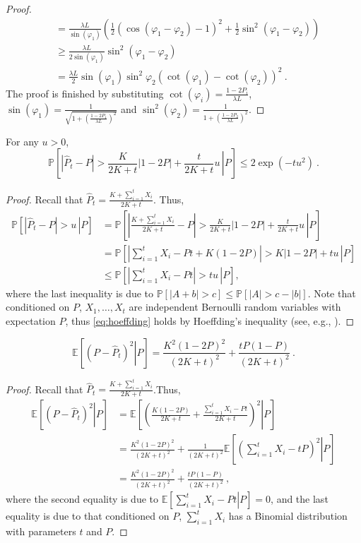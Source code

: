 \documentclass[english]{article}
\newcommand{\hP}{\hat{P}}
\newcommand{\Expc}[2]{\mathbb{E}\left[ \left. #1 \right| #2 \right]}
\newcommand{\Prob}[1]{\mathbb{P}\left[#1\right]}
\newcommand{\Probc}[2]{\mathbb{P}\left[\left. #1 \, \right| #2\right]}
\begin{document}
\begin{proof}
\begin{align}
	& = \frac{\lambda L}{\sin (\varphi_{1})} \left(\frac{1}{2}\left(\cos(\varphi_{1}-\varphi_{2})-1\right)^2 + \frac{1}{2} \sin^2 (\varphi_{1}-\varphi_{2})\right) \\
	& \ge  \frac{\lambda L}{2 \sin (\varphi_{1})}  \sin^2 (\varphi_{1}-\varphi_{2}) \nonumber \\
	& = \frac{\lambda L}{2} \sin (\varphi_{1}) \sin^2 \varphi_{2} \left(\cot (\varphi_{1} )- \cot (\varphi_{2})\right)^2~. %
	\end{align}
	The proof is finished by substituting $\cot (\varphi_i) = \frac{1-2P_i}{\lambda L}$, $\sin(\varphi_1) = \frac{1}{\sqrt{1+\left(\frac{1-2P_1}{\lambda L}\right)^2}}$ and $\sin^2 (\varphi_2) =   \frac{1}{1+\left(\frac{1-2P_2}{\lambda L}\right)^2}$.
\end{proof}

\begin{lemma}[Concentration of $\hP_{t}$] For any $u>0$,
	\label{lem:concenPhat}
	\[
	\Probc{|\hat P_{t}-P| > \frac{K}{2K+t}|1-2P| + \frac{t}{2K+t}u}{P} \le 2\exp(-tu^2)~.
	\]
\end{lemma}
\begin{proof}
	Recall that $\hat P_t = \frac{K+\sum_{i=1}^{t}X_i}{2K+t}$. Thus, 
	\begin{align} 
	\Probc{|\hat P_{t}-P| > u }{P} & = \Probc{\left| \frac{K+\sum_{i=1}^{t}X_i}{2K+t} -P\right| > \frac{K}{2K+t}|1-2P| + \frac{t}{2K+t}u}{P} \nonumber \\ 
	& =  \Probc{\left| \sum_{i=1}^{t}X_i - Pt + K(1-2P) \right| > K|1-2P|+ tu }{P} \nonumber \\ 
	& \le \Probc{\left| \sum_{i=1}^{t}X_i - Pt \right| > tu }{P}, \label{eq:hoeffding}
	\end{align}
	where the last inequality is due to $\Prob{|A+b|>c} \le \Prob{|A| > c-|b|}$. Note that conditioned on $P$, $X_1, \ldots, X_t$ are independent Bernoulli random variables with expectation $P$, thus \eqref{eq:hoeffding} holds by Hoeffding's inequality (see, e.g., \cite[Corollary~A.1]{CBLu06:book}).
\end{proof}

\begin{lemma}
	\label{lem:bayeserror}
	\[
	\Expc{(P-\hat{P}_t)^2}{P} = \frac{K^2(1-2P)^2}{(2K+t)^2} + \frac{tP(1-P)}{(2K+t)^2}~.
	\]
\end{lemma}
\begin{proof}
	Recall that $\hat P_t = \frac{K+\sum_{i=1}^{t}X_i}{2K+t}$.Thus, 
	\begin{align*}
	\Expc{(P-\hat{P}_t)^2}{P} & = \Expc{\left(\frac{K(1-2P)}{2K+t} + \frac{\sum_{i=1}^{t}X_i- Pt}{2K+t}\right)^2}{P} \\
	& = \frac{K^2(1-2P)^2}{(2K+t)^2} + \frac{1}{(2K+t)^2}\Expc{ \left(\sum_{i=1}^{t}X_i - tP\right)^2}{P} \\
	& = \frac{K^2(1-2P)^2}{(2K+t)^2} + \frac{tP(1-P)}{(2K+t)^2}~,
	\end{align*}
	where the second equality is due to $\Expc{ \sum_{i=1}^{t}X_i - Pt}{P} =0$, and the last equality is due to that conditioned on $P$, $\sum_{i=1}^{t}X_i$ has a Binomial distribution with parameters $t$ and $P$.
\end{proof}
\end{document}
